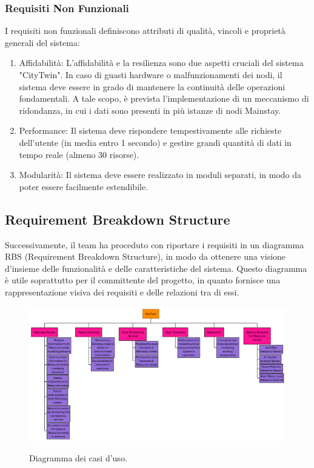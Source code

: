 \subsubsection{Requisiti Non Funzionali}
I requisiti non funzionali definiscono attributi di qualità, vincoli e proprietà generali del sistema:
\begin{enumerate}
    \item Affidabilità: L'affidabilità e la resilienza sono due aspetti cruciali del sistema "CityTwin". In caso di guasti hardware o malfunzionamenti dei nodi, il sistema deve essere in grado di mantenere la continuità delle operazioni fondamentali. A tale scopo, è prevista l'implementazione di un meccanismo di ridondanza, in cui i dati sono presenti in più istanze di nodi Mainstay.
    \item Performance: Il sistema deve rispondere tempestivamente alle richieste dell'utente (in media entro 1 secondo) e gestire grandi quantità di dati in tempo reale (almeno 30 risorse).
    \item Modularità: Il sistema deve essere realizzato in moduli separati, in modo da poter essere facilmente estendibile.
\end{enumerate}

\subsection{Requirement Breakdown Structure}

Successivamente, il team ha proceduto con riportare i requisiti in un diagramma RBS (Requirement Breakdown Structure), in modo da ottenere una visione d'insieme delle funzionalità e delle caratteristiche del sistema. Questo diagramma è utile soprattutto per il committente del progetto, in quanto fornisce una rappresentazione visiva dei requisiti e delle relazioni tra di essi.

\begin{figure}[H]
    \centering
    \caption{Diagramma dei casi d'uso.}
    \includegraphics[height=.8\textwidth, angle=90]{figures/RBS.pdf}
    \label{fig:rbs}
\end{figure}

